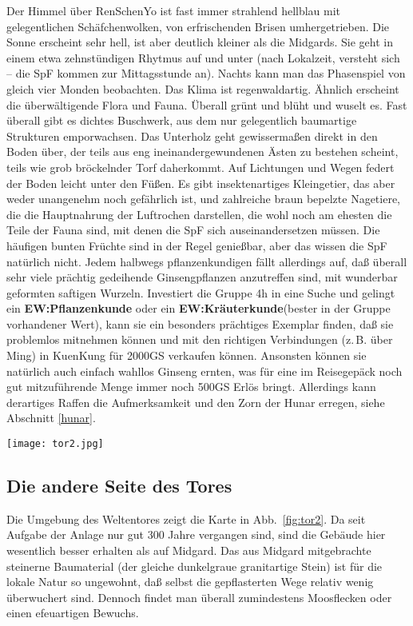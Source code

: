 \documentclass[
a4paper,
twoside,
DIV=calc,
BCOR=4mm,
fontsize=9pt,
twocolumn=on,
titlepage=on,
parskip=half
]{scrartcl}
\begin{document}
Der Himmel über RenSchenYo ist fast immer strahlend hellblau mit
gelegentlichen Schäfchenwolken, von erfrischenden Brisen
umhergetrieben. Die Sonne erscheint sehr hell, ist aber deutlich
kleiner als die Midgards. Sie geht in einem etwa zehnstündigen Rhytmus
auf und unter (nach Lokalzeit, versteht sich -- die SpF kommen zur
Mittagsstunde an). Nachts kann man das Phasenspiel von gleich vier
Monden beobachten. Das Klima ist regenwaldartig. Ähnlich erscheint die
überwältigende Flora und Fauna. Überall grünt und blüht und wuselt
es. Fast überall gibt es dichtes Buschwerk, aus dem nur gelegentlich
baumartige Strukturen emporwachsen. Das Unterholz geht gewissermaßen
direkt in den Boden über, der teils aus eng ineinandergewundenen Ästen
zu bestehen scheint, teils wie grob bröckelnder Torf daherkommt. Auf
Lichtungen und Wegen federt der Boden leicht unter den Füßen. Es gibt
insektenartiges Kleingetier, das aber weder unangenehm noch gefährlich
ist, und zahlreiche braun bepelzte Nagetiere, die die Hauptnahrung der
Luftrochen darstellen, die wohl noch am ehesten die Teile der Fauna
sind, mit denen die SpF sich auseinandersetzen müssen. Die häufigen
bunten Früchte sind in der Regel genießbar, aber das wissen die SpF
natürlich nicht. Jedem halbwegs pflanzenkundigen fällt allerdings auf,
daß überall sehr viele prächtig gedeihende Ginsengpflanzen anzutreffen
sind, mit wunderbar geformten saftigen Wurzeln. Investiert die Gruppe
4h in eine Suche und gelingt ein \textbf{EW:Pflanzenkunde} oder ein
\textbf{EW:Kräuterkunde}(bester in der Gruppe vorhandener Wert), kann
sie ein besonders prächtiges Exemplar finden, daß sie problemlos
mitnehmen können und mit den richtigen Verbindungen (z.\,B. über Ming)
in KuenKung für 2000GS verkaufen können. Ansonsten können sie
natürlich auch einfach wahllos Ginseng ernten, was für eine im
Reisegepäck noch gut mitzuführende Menge immer noch 500GS Erlös
bringt. Allerdings kann derartiges Raffen die Aufmerksamkeit und den
Zorn der Hunar erregen, siehe Abschnitt \ref{hunar}.

\begin{figure*}[t]
  \centering
  \texttt{[image: tor2.jpg]}
  \caption{Die RenSchenYo-Seite des Weltentores}
  \label{fig:tor2}
\end{figure*}

\subsection{Die andere Seite des Tores}

Die Umgebung des Weltentores zeigt die Karte in
Abb.~\ref{fig:tor2}. Da seit Aufgabe der Anlage nur gut 300 Jahre
vergangen sind, sind die Gebäude hier wesentlich besser erhalten als
auf Midgard. Das aus Midgard mitgebrachte steinerne Baumaterial (der
gleiche dunkelgraue granitartige Stein) ist für die lokale Natur so
ungewohnt, daß selbst die gepflasterten Wege relativ wenig überwuchert
sind. Dennoch findet man überall zumindestens Moosflecken oder einen
efeuartigen Bewuchs.
\end{document}
